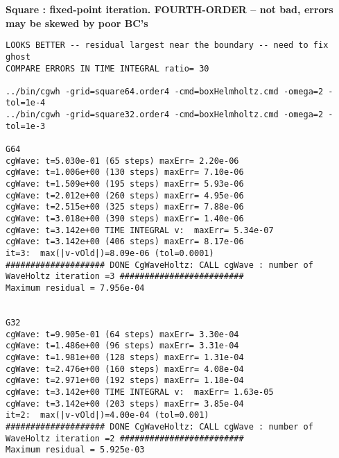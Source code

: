 \documentclass[preprint,11pt]{elsarticle}
\begin{document}
\bigskip
\textbf{Square : fixed-point iteration. FOURTH-ORDER -- not bad, errors may be skewed by poor BC's }
\begin{Verbatim}[fontsize=\scriptsize]
LOOKS BETTER -- residual largest near the boundary -- need to fix ghost 
COMPARE ERRORS IN TIME INTEGRAL ratio= 30 

../bin/cgwh -grid=square64.order4 -cmd=boxHelmholtz.cmd -omega=2 -tol=1e-4
../bin/cgwh -grid=square32.order4 -cmd=boxHelmholtz.cmd -omega=2 -tol=1e-3

G64
cgWave: t=5.030e-01 (65 steps) maxErr= 2.20e-06
cgWave: t=1.006e+00 (130 steps) maxErr= 7.10e-06
cgWave: t=1.509e+00 (195 steps) maxErr= 5.93e-06
cgWave: t=2.012e+00 (260 steps) maxErr= 4.95e-06
cgWave: t=2.515e+00 (325 steps) maxErr= 7.88e-06
cgWave: t=3.018e+00 (390 steps) maxErr= 1.40e-06
cgWave: t=3.142e+00 TIME INTEGRAL v:  maxErr= 5.34e-07
cgWave: t=3.142e+00 (406 steps) maxErr= 8.17e-06
it=3:  max(|v-vOld|)=8.09e-06 (tol=0.0001)
#################### DONE CgWaveHoltz: CALL cgWave : number of WaveHoltz iteration =3 #########################
Maximum residual = 7.956e-04


G32
cgWave: t=9.905e-01 (64 steps) maxErr= 3.30e-04
cgWave: t=1.486e+00 (96 steps) maxErr= 3.31e-04
cgWave: t=1.981e+00 (128 steps) maxErr= 1.31e-04
cgWave: t=2.476e+00 (160 steps) maxErr= 4.08e-04
cgWave: t=2.971e+00 (192 steps) maxErr= 1.18e-04
cgWave: t=3.142e+00 TIME INTEGRAL v:  maxErr= 1.63e-05
cgWave: t=3.142e+00 (203 steps) maxErr= 3.85e-04
it=2:  max(|v-vOld|)=4.00e-04 (tol=0.001)
#################### DONE CgWaveHoltz: CALL cgWave : number of WaveHoltz iteration =2 #########################
Maximum residual = 5.925e-03
\end{Verbatim}
\end{document}
